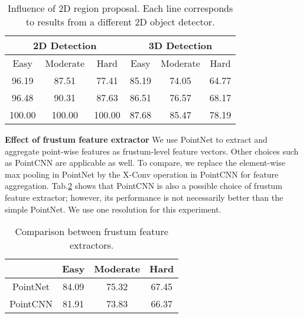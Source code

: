 \documentclass[letterpaper, 10 pt, conference]{ieeeconf}
\begin{document}
\begin{table}[h]
	\begin{center}
	\begin{tabular}{ccc|ccc}
		\hline
		\multicolumn{3}{c|}{2D Detection} & \multicolumn{3}{c}{3D Detection}                                     \\ \hline
		Easy                              & Moderate                         & Hard   & Easy  & Moderate & Hard  \\ \hline
		96.19                             & 87.51                            & 77.41  & 85.19 & 74.05    & 64.77 \\
		96.48                             & 90.31                            & 87.63  & 86.51 & 76.57    & 68.17 \\
		100.00                            & 100.00                           & 100.00 & 87.68 & 85.47    & 78.19 \\ \hline
	\end{tabular}
	\caption{Influence of 2D region proposal. Each line corresponds to results from a different 2D object detector. }
	\label{Tab:2DDectors}
	\end{center}
	\vspace{-0.5cm}
\end{table}

\vspace{0.1cm}
\noindent\textbf{Effect of frustum feature extractor} We use PointNet \cite{qi2017pointnet} to extract and aggregate point-wise features as frustum-level feature vectors. Other choices such as PointCNN \cite{li2018pointcnn} are applicable as well. To compare, we replace the element-wise max pooling in PointNet by the X-Conv operation in PointCNN for feature aggregation. Tab.\ref{Tab:XConv} shows that PointCNN is also a possible choice of frustum feature extractor; however, its performance is not necessarily better than the simple PointNet. We use one resolution for this experiment.

\begin{table}[ht]
	\begin{center}
		\begin{tabular}{c|ccc}
			\hline
			         & Easy  & Moderate & Hard  \\ \hline
			PointNet & 84.09 & 75.32    & 67.45 \\
			PointCNN & 81.91 & 73.83    & 66.37 \\ \hline
		\end{tabular}
		\caption{Comparison between frustum feature extractors.}
		\label{Tab:XConv}
	\end{center}
	\vspace{-0.5cm}
\end{table}
\end{document}
